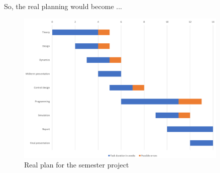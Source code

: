 So, the real planning would become ...

\begin{figure}[h!]
   \centering
   \includegraphics[width=0.9\textwidth]{images/introduction/expectedGantt}
   \caption{Real plan for the semester project}
   \label{pics:realGantt}
\end{figure}

\clearpage